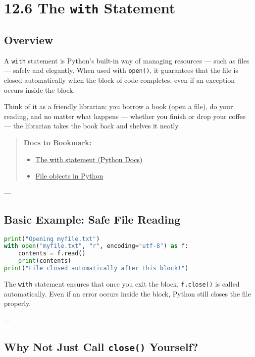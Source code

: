 \chapter{12.6 The \texttt{with} Statement}

\section*{Overview}
A \texttt{with} statement is Python’s built-in way of managing resources — such as files — safely and elegantly.  
When used with \texttt{open()}, it guarantees that the file is closed automatically when the block of code completes,  
even if an exception occurs inside the block.

Think of it as a friendly librarian: you borrow a book (open a file), do your reading,  
and no matter what happens — whether you finish or drop your coffee — the librarian takes the book back and shelves it neatly.

\begin{quote}
\textbf{Docs to Bookmark:}
\begin{itemize}
  \item \href{https://docs.python.org/3/reference/compound_stmts.html#the-with-statement}{The with statement (Python Docs)}
  \item \href{https://docs.python.org/3/tutorial/inputoutput.html#methods-of-file-objects}{File objects in Python}
\end{itemize}
\end{quote}

---

\section{Basic Example: Safe File Reading}

\begin{lstlisting}[language=Python, caption={Opening and reading a file safely.}]
print("Opening myfile.txt")
with open("myfile.txt", "r", encoding="utf-8") as f:
    contents = f.read()
    print(contents)
print("File closed automatically after this block!")
\end{lstlisting}

\noindent
The \texttt{with} statement ensures that once you exit the block, \texttt{f.close()} is called automatically.  
Even if an error occurs inside the block, Python still closes the file properly.

---

\section{Why Not Just Call \texttt{close()} Yourself?}

